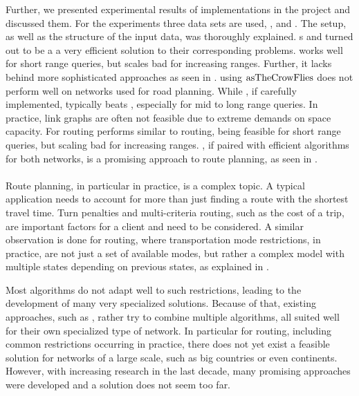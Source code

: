 	Further, we presented experimental results of implementations in the \cobweb project  and discussed them.
	For the experiments three data sets are used, \freiburgR, \stuttgartR and \switzerlandR.
	The setup, as well as the structure of the input data, was thoroughly explained. {\coverTree}s and \csa turned out to be a a very
	efficient solution to their corresponding problems. \dijkstra works well for short range queries,
	but scales bad for increasing ranges. Further, it lacks behind more sophisticated approaches as seen in .
	\astar using $\operatorname{asTheCrowFlies}$ does not perform well on networks used for road planning. While \alt, if carefully implemented, typically beats \dijkstra,
	especially for mid to long range queries. In practice, link graphs are often not feasible due to extreme demands on space capacity. For \multiModal routing
	\dijkstra performs similar to \uniModal routing, being feasible for short range queries, but scaling bad for increasing ranges. \anr, if paired with efficient algorithms
	for both networks, is a promising approach to \multiModal route planning, as seen in .\\\\
	Route planning, in particular in practice, is a complex topic. A typical application needs to account for more than just finding a route with the shortest travel time.
	Turn penalties and multi-criteria routing, such as the cost of a trip, are important factors for a client and need to be considered. A similar observation is done
	for \multiModal routing, where transportation mode restrictions, in practice, are not just a set of available modes, but rather a complex model with
	multiple states depending on previous states, as explained in .
	
	Most algorithms do not adapt well to such restrictions, leading to the development of many very specialized solutions. Because of that, existing
	approaches, such as \anr, rather try to combine multiple algorithms, all suited well for their own specialized type of network. In particular
	for \multiModal routing, including common restrictions occurring in practice, there does not yet exist a feasible solution for networks of a large scale,
	such as big countries or even continents. However, with increasing research in the last decade, many promising approaches were developed and
	a solution does not seem too far.